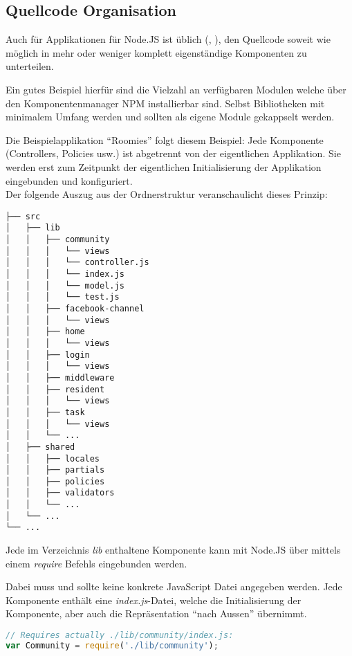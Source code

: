 \subsection{Quellcode Organisation}
Auch für Applikationen für Node.JS ist üblich (\cite{TJH_ComponentStructure}, \cite{IZS_ComponentStructure}), den Quellcode soweit wie möglich in mehr oder weniger komplett eigenständige Komponenten zu unterteilen.

Ein gutes Beispiel hierfür sind die Vielzahl an verfügbaren Modulen welche über den Komponentenmanager NPM \cite{NPM} installierbar sind. Selbst Bibliotheken mit minimalem Umfang werden und sollten als eigene Module gekappselt werden.

Die Beispielapplikation ``Roomies'' folgt diesem Beispiel: Jede Komponente (Controllers, Policies usw.) ist abgetrennt von der eigentlichen Applikation. Sie werden erst zum Zeitpunkt der eigentlichen Initialisierung der Applikation eingebunden und konfiguriert.\\[0.5mm]

Der folgende Auszug aus der Ordnerstruktur veranschaulicht dieses Prinzip:
\begin{verbatim}
├── src
│   ├── lib
│   │   ├── community
│   │   │   └── views
│   │   │   └── controller.js
│   │   │   └── index.js
│   │   │   └── model.js
│   │   │   └── test.js
│   │   ├── facebook-channel
│   │   │   └── views
│   │   ├── home
│   │   │   └── views
│   │   ├── login
│   │   │   └── views
│   │   ├── middleware
│   │   ├── resident
│   │   │   └── views
│   │   ├── task
│   │   │   └── views
│   │   └── ...
│   ├── shared
│   │   ├── locales
│   │   ├── partials
│   │   ├── policies
│   │   ├── validators
│   │   └── ...
│   └── ...
└── ...
\end{verbatim}

Jede im Verzeichnis \emph{lib} enthaltene Komponente kann mit Node.JS über mittels einem \emph{require} Befehls eingebunden werden.

Dabei muss und sollte keine konkrete JavaScript Datei angegeben werden. Jede Komponente enthält eine \emph{index.js}-Datei, welche die Initialisierung der Komponente, aber auch die Repräsentation ``nach Aussen'' übernimmt.

\begin{lstlisting}[language=JavaScript, caption=Einbindung der Community-Komponenten]
// Requires actually ./lib/community/index.js:
var Community = require('./lib/community');
\end{lstlisting}
